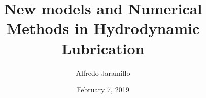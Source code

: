 \title{New models and Numerical Methods in Hydrodynamic Lubrication}
\author{Alfredo Jaramillo}
\date{February 7, 2019}